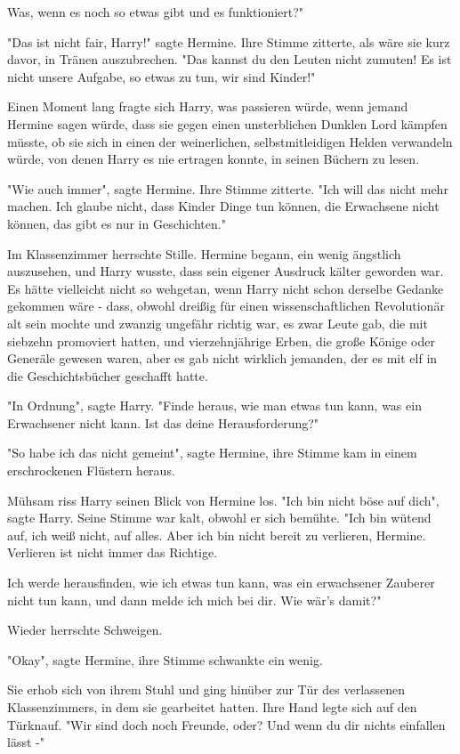 {Was, wenn es noch so etwas gibt und es funktioniert?"

"Das ist nicht fair, Harry!" sagte Hermine. Ihre Stimme zitterte, als wäre sie kurz davor, in Tränen auszubrechen. "Das kannst du den Leuten nicht zumuten! Es ist nicht unsere Aufgabe, so etwas zu tun, wir sind Kinder!"

Einen Moment lang fragte sich Harry, was passieren würde, wenn jemand Hermine sagen würde, dass sie gegen einen unsterblichen Dunklen Lord kämpfen müsste, ob sie sich in einen der weinerlichen, selbstmitleidigen Helden verwandeln würde, von denen Harry es nie ertragen konnte, in seinen Büchern zu lesen.

"Wie auch immer", sagte Hermine. Ihre Stimme zitterte. "Ich will das nicht mehr machen. Ich glaube nicht, dass Kinder Dinge tun können, die Erwachsene nicht können, das gibt es nur in Geschichten."

Im Klassenzimmer herrschte Stille. Hermine begann, ein wenig ängstlich auszusehen, und Harry wusste, dass sein eigener Ausdruck kälter geworden war. Es hätte vielleicht nicht so wehgetan, wenn Harry nicht schon derselbe Gedanke gekommen wäre - dass, obwohl dreißig für einen wissenschaftlichen Revolutionär alt sein mochte und zwanzig ungefähr richtig war, es zwar Leute gab, die mit siebzehn promoviert hatten, und vierzehnjährige Erben, die große Könige oder Generäle gewesen waren, aber es gab nicht wirklich jemanden, der es mit elf in die Geschichtsbücher geschafft hatte.

"In Ordnung", sagte Harry. "Finde heraus, wie man etwas tun kann, was ein Erwachsener nicht kann. Ist das deine Herausforderung?"

"So habe ich das nicht gemeint", sagte Hermine, ihre Stimme kam in einem erschrockenen Flüstern heraus.

Mühsam riss Harry seinen Blick von Hermine los. "Ich bin nicht böse auf dich", sagte Harry. Seine Stimme war kalt, obwohl er sich bemühte. "Ich bin wütend auf, ich weiß nicht, auf alles. Aber ich bin nicht bereit zu verlieren, Hermine. Verlieren ist nicht immer das Richtige.

Ich werde herausfinden, wie ich etwas tun kann, was ein erwachsener Zauberer nicht tun kann, und dann melde ich mich bei dir. Wie wär's damit?"

Wieder herrschte Schweigen.

"Okay", sagte Hermine, ihre Stimme schwankte ein wenig.

Sie erhob sich von ihrem Stuhl und ging hinüber zur Tür des verlassenen Klassenzimmers, in dem sie gearbeitet hatten. Ihre Hand legte sich auf den Türknauf. "Wir sind doch noch Freunde, oder? Und wenn du dir nichts einfallen lässt -"

}
